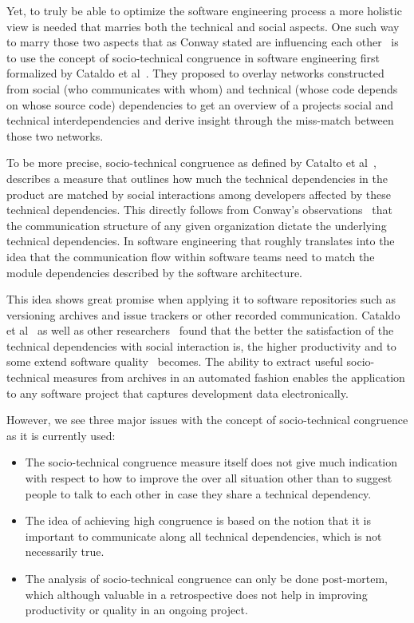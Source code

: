 Yet, to truly be able to optimize the software engineering process a more holistic view is needed that marries both the technical and social aspects.
One such way to marry those two aspects that as Conway stated are influencing each other~\cite{conway:datamination:1968} is to use the concept of socio-technical congruence in software engineering first formalized by Cataldo et al~\cite{cataldo:cscw:2006}.
They proposed to overlay networks constructed from social (who communicates with whom) and technical (whose code depends on whose source code) dependencies to get an overview of a projects social and technical interdependencies and derive insight through the miss-match between those two networks.

To be more precise, socio-technical congruence as defined by Catalto et al~\cite{cataldo:cscw:2006}, describes a measure that outlines how much the technical dependencies in the product are matched by social interactions among developers affected by these technical dependencies.
This directly follows from Conway's observations~\cite{conway:datamination:1968} that the communication structure of any given organization dictate the underlying technical dependencies.
In software engineering that roughly translates into the idea that the communication flow within software teams need to match the module dependencies described by the software architecture. 
 
This idea shows great promise when applying it to software repositories such as versioning archives and issue trackers or other recorded communication.
Cataldo et al~\cite{cataldo:cscw:2006,cataldo:esem:2008} as well as other researchers~\cite{valetto:msr:2007,ehrlich:stc:2008} found that the better the satisfaction of the technical dependencies with social interaction is, the higher productivity and to some extend software quality~\cite{kwan:tse:2011,bird:issre:2009,kwan:stc:2009} becomes.
The ability to extract useful socio-technical measures from archives in an automated fashion enables the application to any software project that captures development data electronically.

However, we see three major issues with the concept of socio-technical congruence as it is currently used:
\begin{itemize}
\item The socio-technical congruence measure itself does not give much indication with respect to how to improve the over all situation other than to suggest people to talk to each other in case they share a technical dependency. 
\item The idea of achieving high congruence is based on the notion that it is important to communicate along all technical dependencies, which is not necessarily true.
\item The analysis of socio-technical congruence can only be done post-mortem, which although valuable in a retrospective does not help in improving productivity or quality in an ongoing project.
\end{itemize}

